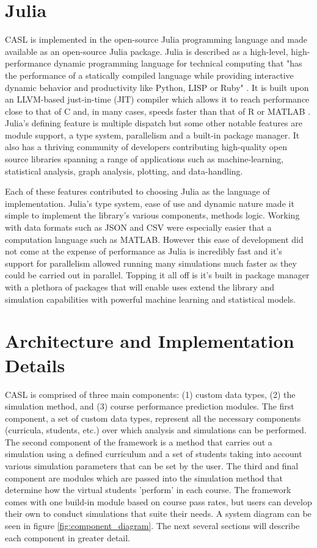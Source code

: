 \documentclass[botnum, fleqn]{unmeethesis}
\begin{document}
  \section{Julia}
    CASL is implemented in the open-source Julia programming language and made available as an open-source Julia package. Julia is described as a high-level, high-performance dynamic programming language for technical computing that "has the performance of a statically compiled language while providing interactive dynamic behavior and productivity like Python, LISP or Ruby" \cite{Julia}. It is built upon an LLVM-based just-in-time (JIT) compiler which allows it to reach performance close to that of C and, in many cases, speeds faster than that of R or MATLAB \cite{Julia}. Julia's defining feature is multiple dispatch but some other notable features are module support, a type system, parallelism and a built-in package manager. It also has a thriving community of developers contributing high-quality open source libraries spanning a range of applications such as machine-learning, statistical analysis, graph analysis, plotting, and data-handling.

    Each of these features contributed to choosing Julia as the language of implementation. Julia's type system, ease of use and dynamic nature made it simple to implement the library's various components, methods logic. Working with data formats such as JSON and CSV were especially easier that a computation language such as MATLAB. However this ease of development did not come at the expense of performance as Julia is incredibly fast and it's support for parallelism allowed running many simulations much faster as they could be carried out in parallel. Topping it all off is it's built in package manager with a plethora of packages that will enable uses extend the library and simulation capabilities with powerful machine learning and statistical models.

  
  \section{Architecture and Implementation Details}
    CASL is comprised of three main components: (1) custom data types, (2) the simulation method, and (3) course performance prediction modules. The first component, a set of custom data types, represent all the necessary components (curricula, students, etc.) over which analysis and simulations can be performed. The second component of the framework is a method that carries out a simulation using a defined curriculum and a set of students taking into account various simulation parameters that can be set by the user. The third and final component are modules which are passed into the simulation method that determine how the virtual students 'perform' in each course. The framework comes with one build-in module based on course pass rates, but users can develop their own to conduct simulations that suite their needs. A system diagram can be seen in figure \ref{fig:component_diagram}. The next several sections will describe each component in greater detail.
\end{document}
